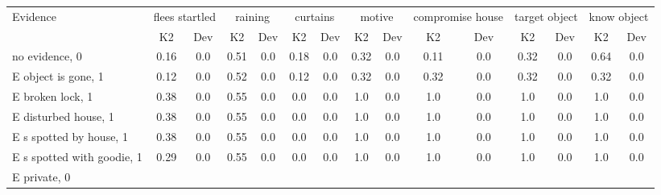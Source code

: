 \begin{table}\begin{tabular}{l|cc|cc|cc|cc|cc|cc|cc}\toprule\multirow{2}{*}{Evidence} & \multicolumn{2}{c}{flees startled}& \multicolumn{2}{c}{raining}& \multicolumn{2}{c}{curtains}& \multicolumn{2}{c}{motive}& \multicolumn{2}{c}{compromise house}& \multicolumn{2}{c}{target object}& \multicolumn{2}{c}{know object}\\& {K2} & {Dev}& {K2} & {Dev}& {K2} & {Dev}& {K2} & {Dev}& {K2} & {Dev}& {K2} & {Dev}& {K2} & {Dev}\\\midrule
no evidence, 0 & \cellcolor{Bittersweet}0.16&\cellcolor{Bittersweet}0.0&\cellcolor{Bittersweet}0.51&\cellcolor{Bittersweet}0.0&\cellcolor{Bittersweet}0.18&\cellcolor{Bittersweet}0.0&\cellcolor{Bittersweet}0.32&\cellcolor{Bittersweet}0.0&\cellcolor{Bittersweet}0.11&\cellcolor{Bittersweet}0.0&\cellcolor{Bittersweet}0.32&\cellcolor{Bittersweet}0.0&\cellcolor{Bittersweet}0.64&\cellcolor{Bittersweet}0.0\\E object is gone, 1 & \cellcolor{Bittersweet}0.12&\cellcolor{Bittersweet}0.0&\cellcolor{Bittersweet}0.52&\cellcolor{Bittersweet}0.0&\cellcolor{Bittersweet}0.12&\cellcolor{Bittersweet}0.0&\cellcolor{Bittersweet}0.32&\cellcolor{Bittersweet}0.0&\cellcolor{Bittersweet}0.32&\cellcolor{Bittersweet}0.0&\cellcolor{Bittersweet}0.32&\cellcolor{Bittersweet}0.0&\cellcolor{Bittersweet}0.32&\cellcolor{Bittersweet}0.0\\E broken lock, 1 & \cellcolor{Bittersweet}0.38&\cellcolor{Bittersweet}0.0&\cellcolor{Bittersweet}0.55&\cellcolor{Bittersweet}0.0&\cellcolor{Bittersweet}0.0&\cellcolor{Bittersweet}0.0&\cellcolor{Bittersweet}1.0&\cellcolor{Bittersweet}0.0&\cellcolor{Bittersweet}1.0&\cellcolor{Bittersweet}0.0&\cellcolor{Bittersweet}1.0&\cellcolor{Bittersweet}0.0&\cellcolor{Bittersweet}1.0&\cellcolor{Bittersweet}0.0\\E disturbed house, 1 & \cellcolor{Bittersweet}0.38&\cellcolor{Bittersweet}0.0&\cellcolor{Bittersweet}0.55&\cellcolor{Bittersweet}0.0&\cellcolor{Bittersweet}0.0&\cellcolor{Bittersweet}0.0&\cellcolor{Bittersweet}1.0&\cellcolor{Bittersweet}0.0&\cellcolor{Bittersweet}1.0&\cellcolor{Bittersweet}0.0&\cellcolor{Bittersweet}1.0&\cellcolor{Bittersweet}0.0&\cellcolor{Bittersweet}1.0&\cellcolor{Bittersweet}0.0\\E s spotted by house, 1 & \cellcolor{Bittersweet}0.38&\cellcolor{Bittersweet}0.0&\cellcolor{Bittersweet}0.55&\cellcolor{Bittersweet}0.0&\cellcolor{Bittersweet}0.0&\cellcolor{Bittersweet}0.0&\cellcolor{Bittersweet}1.0&\cellcolor{Bittersweet}0.0&\cellcolor{Bittersweet}1.0&\cellcolor{Bittersweet}0.0&\cellcolor{Bittersweet}1.0&\cellcolor{Bittersweet}0.0&\cellcolor{Bittersweet}1.0&\cellcolor{Bittersweet}0.0\\E s spotted with goodie, 1 & \cellcolor{Bittersweet}0.29&\cellcolor{Bittersweet}0.0&\cellcolor{Bittersweet}0.55&\cellcolor{Bittersweet}0.0&\cellcolor{Bittersweet}0.0&\cellcolor{Bittersweet}0.0&\cellcolor{Bittersweet}1.0&\cellcolor{Bittersweet}0.0&\cellcolor{Bittersweet}1.0&\cellcolor{Bittersweet}0.0&\cellcolor{Bittersweet}1.0&\cellcolor{Bittersweet}0.0&\cellcolor{Bittersweet}1.0&\cellcolor{Bittersweet}0.0\\E private, 0 & 
\end{tabular}
\end{table}
